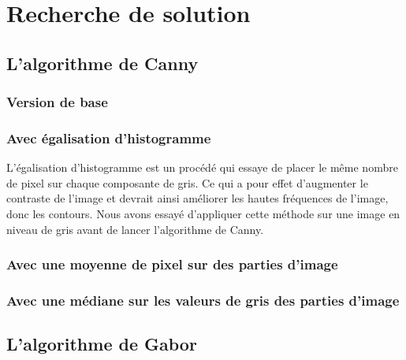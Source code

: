 \section{Recherche de solution}

\subsection{L'algorithme de Canny}

\subsubsection{Version de base}

\subsubsection{Avec égalisation d'histogramme}
L'égalisation d'histogramme est un procédé qui essaye de placer le même nombre de pixel
sur chaque composante de gris. Ce qui a pour effet d'augmenter le contraste de l'image
et devrait ainsi améliorer les hautes fréquences de l'image, donc les contours. Nous avons
essayé d'appliquer cette méthode sur une image en niveau de gris avant de lancer l'algorithme
de Canny.

\subsubsection{Avec une moyenne de pixel sur des parties d'image}

\subsubsection{Avec une médiane sur les valeurs de gris des parties d'image}

\subsection{L'algorithme de Gabor}